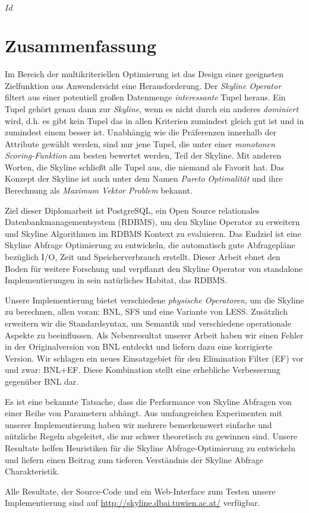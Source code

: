 
\svnInfo $Id$


\chapter*{Zusammenfassung\revision}


Im Bereich der multikriteriellen Optimierung ist das Design einer
geeigneten Zielfunktion aus Anwendersicht eine Herausforderung.
%
Der \emph{Skyline Operator} filtert aus einer potentiell gro\ss{}en
Datenmenge \emph{interessante} Tupel heraus.
%
Ein Tupel geh\"ort genau dann zur \emph{Skyline}, wenn es nicht durch
ein anderes \emph{dominiert} wird, d.h. es gibt kein Tupel das in allen
Kriterien zumindest gleich gut ist und in zumindest einem besser ist.
%
Unabh\"angig wie die Pr\"aferenzen innerhalb der Attribute gew\"ahlt
werden, sind nur jene Tupel, die unter einer \emph{monotonen
Scoring-Funktion} am besten bewertet werden, Teil der Skyline.
%
Mit anderen Worten, die Skyline schlie\ss{}t alle Tupel aus, die
niemand als Favorit hat.
%
Das Konzept der Skyline ist auch unter dem Namen \emph{Pareto
Optimalit\"at} und ihre Berechnung als \emph{Maximum Vektor
Problem} bekannt.


Ziel dieser Diplomarbeit ist PostgreSQL, ein Open Source relationales
Datenbankmanagementsystem (RDBMS), um den Skyline Operator zu
erweitern und Skyline Algorithmen im RDBMS Kontext zu evaluieren.
%
Das Endziel ist eine Skyline Abfrage Optimierung zu entwickeln, 
die automatisch gute Abfragepl\"ane bez\"uglich I/O, Zeit und
Speicherverbrauch erstellt.
%
Dieser Arbeit ebnet den Boden f\"ur weitere Forschung und verpflanzt
den Skyline Operator von standalone Implementierungen in sein
nat\"urliches Habitat, das RDBMS.


Unsere Implementierung bietet verschiedene \emph{physische
Operatoren}, um die Skyline zu berechnen, allen voran: BNL, SFS und
eine Variante von LESS.
%
Zus\"atzlich erweitern wir die Standardsyntax, um Semantik und
verschiedene operationale Aspekte zu beeinflussen.
%
Als Nebenresultat unserer Arbeit haben wir einen Fehler in der
Originalversion von BNL entdeckt und liefern dazu eine korrigierte
Version.
%
Wir schlagen ein neues Einsatzgebiet f\"ur den Elimination Filter (EF)
vor und zwar: BNL+EF. Diese Kombination stellt eine erhebliche
Verbesserung gegen\"uber BNL dar.

Es ist eine bekannte Tatsache, dass die Performance von Skyline
Abfragen von einer Reihe von Parametern abh\"angt.
%
Aus umfangreichen Experimenten mit unserer Implementierung haben wir
mehrere bemerkenswert einfache und n\"utzliche Regeln abgeleitet, die
nur schwer theoretisch zu gewinnen sind.
%
Unsere Resultate helfen Heuristiken f\"ur die Skyline
Abfrage-Optimierung zu entwickeln und liefern einen Beitrag zum
tieferen Verst\"andnis der Skyline Abfrage Charakteristik.


Alle Resultate, der Source-Code und ein Web-Interface zum Testen
unsere Implementierung sind auf
\url{http://skyline.dbai.tuwien.ac.at/} verf\"ugbar.

